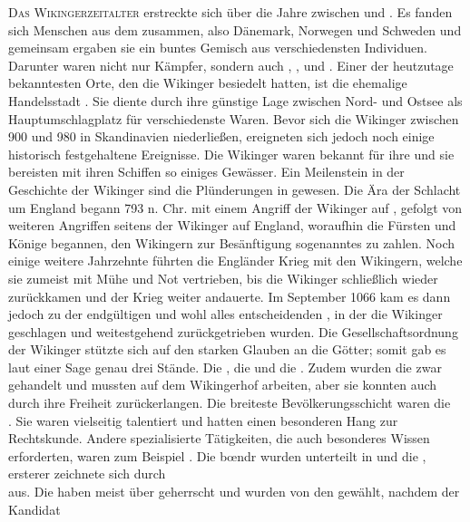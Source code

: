 \documentclass[12pt,a4paper,ngerman,openany]{book}
\newcommand{\flettrine}[2]{\lettrine[lines=2, depth=0, loversize=0.25, nindent=0.69pt, lraise=0.15]{\initfamily{#1}}{#2}}
\newcommand*\initfamily{\usefont{U}{GotIn}{xl}{n}}
\newlength{\diebox}
\newcommand{\luecke}[1]{\settowidth{\diebox}{#1}\raisebox{-1.0ex}{\parbox{2.7\diebox}{\dotfill}}}
\begin{document}
\flettrine{D}{Das Wikingerzeitalter} erstreckte sich über die Jahre zwischen \luecke{7.} und \luecke{10.}. Es fanden sich Menschen aus dem \luecke{skandinav} zusammen, also Dänemark, Norwegen und Schweden und gemeinsam ergaben sie ein buntes Gemisch aus verschiedensten Individuen. Darunter waren nicht nur Kämpfer, sondern auch \luecke{Händl}, \luecke{Baue}, \luecke{Seemänn} und \luecke{Siedle}. Einer der heutzutage bekanntesten Orte, den die Wikinger besiedelt hatten, ist die ehemalige Handelsstadt \luecke{Haithabu}. Sie diente durch ihre günstige Lage zwischen Nord- und Ostsee als Hauptumschlagplatz für verschiedenste Waren.
Bevor sich die Wikinger zwischen 900 und 980 in Skandinavien niederließen, ereigneten sich jedoch noch einige historisch festgehaltene Ereignisse. Die Wikinger waren bekannt für ihre \luecke{Raubzüge} und sie bereisten mit ihren Schiffen so einiges Gewässer. Ein Meilenstein in der Geschichte der Wikinger sind die Plünderungen in \luecke{England} gewesen. Die Ära der Schlacht um England begann 793 n. Chr. mit einem Angriff der Wikinger auf \luecke{das Kloster.}, gefolgt von weiteren Angriffen seitens der Wikinger auf England, woraufhin die Fürsten und Könige begannen, den Wikingern zur Besänftigung sogenanntes \luecke{Danegeld} zu zahlen. Noch einige weitere Jahrzehnte führten die Engländer Krieg mit den Wikingern, welche sie zumeist mit Mühe und Not vertrieben, bis die Wikinger schließlich wieder zurückkamen und der Krieg weiter andauerte. Im September 1066 kam es dann jedoch zu der endgültigen und wohl alles entscheidenden \luecke{Schlacht von.}, in der die Wikinger geschlagen und weitestgehend  zurückgetrieben wurden.
Die Gesellschaftsordnung der Wikinger stützte sich auf den starken Glauben an die Götter; somit gab es laut einer Sage genau drei Stände. Die \luecke{Sklaven}, die \luecke{Freien} und die \luecke{Jarls}.
Zudem wurden die \luecke{Sklaven} zwar gehandelt und mussten auf dem Wikingerhof arbeiten, aber sie konnten auch durch \luecke{harte Arbe.} ihre Freiheit zurückerlangen.
Die breiteste Bevölkerungsschicht waren die \luecke{.....}\\
\luecke{bón}. Sie waren vielseitig talentiert und hatten einen besonderen Hang zur Rechtskunde. Andere spezialisierte Tätigkeiten, die auch besonderes Wissen erforderten, waren zum Beispiel \luecke{SchmiedArzt}. Die bœndr wurden unterteilt in \luecke{stórbœn} und die \luecke{smábœn}, ersterer zeichnete sich durch \luecke{hohes Familienansehe.}\\
\luecke{Wohlstand...} aus. Die \luecke{Könige} haben meist über \luecke{eine kleine region} geherrscht und wurden von den \luecke{stórbœndr} gewählt, nachdem der Kandidat \luecke{einen...}\\
\end{document}
